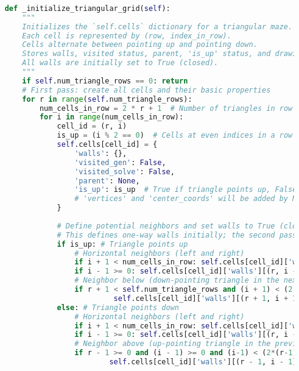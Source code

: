 \documentclass[UTF8]{report}
\theoremstyle{MyLineTheoremStyle} %
\theoremstyle{MyBlockTheoremStyle} %
\theoremstyle{MySubsubsectionStyle} %
\begin{document}
\begin{lstlisting}[language=Python, caption={迷宫生成与求解程序代码}]
    
    def _initialize_triangular_grid(self):
        """
        Initializes the `self.cells` dictionary for a triangular maze.
        Each cell is represented by (row, index_in_row).
        Cells alternate between pointing up and pointing down.
        Stores walls, visited status, parent, 'is_up' status, and drawing vertices/center.
        All walls are initially set to True (closed).
        """
        if self.num_triangle_rows == 0: return
        # First pass: create all cells and their basic properties
        for r in range(self.num_triangle_rows):
            num_cells_in_row = 2 * r + 1  # Number of triangles in row 'r'
            for i in range(num_cells_in_row):
                cell_id = (r, i)
                is_up = (i % 2 == 0)  # Cells at even indices in a row point up, odd indices point down
                self.cells[cell_id] = {
                    'walls': {},
                    'visited_gen': False,
                    'visited_solve': False,
                    'parent': None,
                    'is_up': is_up  # True if triangle points up, False if it points down
                    # 'vertices' and 'center_coords' will be added by MazeApp._update_canvas_size_and_coords
                }
                
                # Define potential neighbors and set walls to True (closed)
                # This defines one-way walls initially; the second pass makes them two-way.
                if is_up: # Triangle points up
                    # Horizontal neighbors (left and right)
                    if i + 1 < num_cells_in_row: self.cells[cell_id]['walls'][(r, i + 1)] = True # Right neighbor (down-pointing)
                    if i - 1 >= 0: self.cells[cell_id]['walls'][(r, i - 1)] = True # Left neighbor (down-pointing)
                    # Neighbor below (down-pointing triangle in the next row)
                    if r + 1 < self.num_triangle_rows and (i + 1) < (2 * (r + 1) + 1): # Check bounds for the cell below
                             self.cells[cell_id]['walls'][(r + 1, i + 1)] = True # Cell (i+1) in row (r+1) is below an up-pointing cell (r,i)
                else: # Triangle points down
                    # Horizontal neighbors (left and right)
                    if i + 1 < num_cells_in_row: self.cells[cell_id]['walls'][(r, i + 1)] = True # Right neighbor (up-pointing)
                    if i - 1 >= 0: self.cells[cell_id]['walls'][(r, i - 1)] = True # Left neighbor (up-pointing)
                    # Neighbor above (up-pointing triangle in the previous row)
                    if r - 1 >= 0 and (i - 1) >= 0 and (i-1) < (2*(r-1)+1): # Check bounds for the cell above
                            self.cells[cell_id]['walls'][(r - 1, i - 1)] = True # Cell (i-1) in row (r-1) is above a down-pointing cell (r,i)
        

\end{lstlisting}
\end{document}

